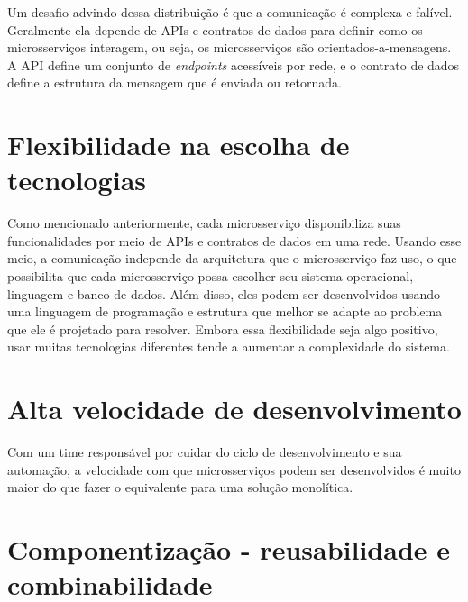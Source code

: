 Um desafio advindo dessa distribuição é que a comunicação é complexa e falível. Geralmente ela depende de APIs e contratos de dados para definir como os microsserviços interagem, ou seja, os microsserviços são orientados-a-mensagens. A API define um conjunto de \emph{endpoints} acessíveis por rede, e o contrato de dados define a estrutura da mensagem que é enviada ou retornada. \cite{Familiar2015}


\section{Flexibilidade na escolha de tecnologias}

Como mencionado anteriormente, cada microsserviço disponibiliza suas funcionalidades por meio de APIs e contratos de dados em uma rede. Usando esse meio, a comunicação independe da arquitetura que o microsserviço faz uso, o que possibilita que cada microsserviço possa escolher seu sistema operacional, linguagem e banco de dados. Além disso, eles podem ser desenvolvidos usando uma linguagem de programação e estrutura que melhor se adapte ao problema que ele é projetado para resolver. Embora essa flexibilidade seja algo positivo, usar muitas tecnologias diferentes tende a aumentar a complexidade do sistema. \cite{oracle_microservices, Familiar2015}

\section{Alta velocidade de desenvolvimento}

Com um time responsável por cuidar do ciclo de desenvolvimento e sua automação, a velocidade com que microsserviços podem ser desenvolvidos é muito maior do que fazer o equivalente para uma solução monolítica. \cite{Familiar2015}

\section{Componentização - reusabilidade e combinabilidade}

